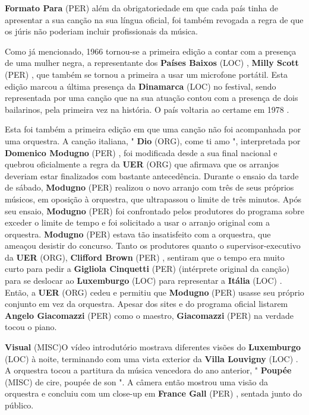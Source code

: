 \documentclass[12pt,a4paper]{article}
\begin{document}
\textbf{Formato Para} (PER) além da obrigatoriedade em que cada país tinha de apresentar a sua canção na sua língua oficial, foi também revogada a regra de que os júris não poderiam incluir profissionais da música.

Como já mencionado, 1966 tornou-se a primeira edição a contar com a presença de uma mulher negra, a representante dos \textbf{Países Baixos} (LOC) , \textbf{Milly Scott} (PER) , que também se tornou a primeira a usar um microfone portátil. Esta edição marcou a última presença da \textbf{Dinamarca} (LOC) no festival, sendo representada por uma canção que na sua atuação contou com a presença de dois bailarinos, pela primeira vez na história. O país voltaria ao certame em 1978 .

Esta foi também a primeira edição em que uma canção não foi acompanhada por uma orquestra. A canção italiana, " \textbf{Dio} (ORG), come ti amo ", interpretada por \textbf{Domenico Modugno} (PER) , foi modificada desde a sua final nacional e quebrou oficialmente a regra da \textbf{UER} (ORG) que afirmava que os arranjos deveriam estar finalizados com bastante antecedência. Durante o ensaio da tarde de sábado, \textbf{Modugno} (PER) realizou o novo arranjo com três de seus próprios músicos, em oposição à orquestra, que ultrapassou o limite de três minutos. Após seu ensaio, \textbf{Modugno} (PER) foi confrontado pelos produtores do programa sobre exceder o limite de tempo e foi solicitado a usar o arranjo original com a orquestra. \textbf{Modugno} (PER) estava tão insatisfeito com a orquestra, que ameaçou desistir do concurso. Tanto os produtores quanto o supervisor-executivo da \textbf{UER} (ORG), \textbf{Clifford Brown} (PER) , sentiram que o tempo era muito curto para pedir a \textbf{Gigliola Cinquetti} (PER) (intérprete original da canção) para se deslocar ao \textbf{Luxemburgo} (LOC) para representar a \textbf{Itália} (LOC) . Então, a \textbf{UER} (ORG) cedeu e permitiu que \textbf{Modugno} (PER) usasse seu próprio conjunto em vez da orquestra. Apesar dos sites e do programa oficial listarem \textbf{Angelo Giacomazzi} (PER) como o maestro, \textbf{Giacomazzi} (PER) na verdade tocou o piano.



\textbf{Visual} (MISC)O vídeo introdutório mostrava diferentes visões do \textbf{Luxemburgo} (LOC) à noite, terminando com uma vista exterior da \textbf{Villa Louvigny} (LOC) . A orquestra tocou a partitura da música vencedora do ano anterior, " \textbf{Poupée} (MISC) de cire, poupée de son ". A câmera então mostrou uma visão da orquestra e concluiu com um close-up em \textbf{France Gall} (PER) , sentada junto do público.
\end{document}
